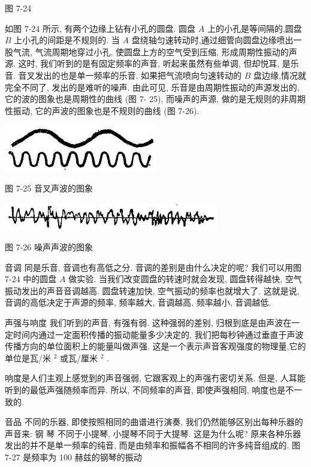 \documentclass[10pt]{article}
\begin{document}
图 7-24

如图 7-24 所示, 有两个边缘上钻有小孔的圆盘. 圆盘 \(A\) 上的小孔是等间隔的,圆盘 \(B\) 上小孔的间距是不规则的. 当 \(A\) 盘绕轴匀速转动时,通过细管向圆盘边缘喷出一股气流, 气流周期地穿过小孔, 使圆盘上方的空气受到压缩, 形成周期性振动的声源. 这时, 我们听到的是有固定频率的声音, 听起来虽然有些单调, 但却悦耳, 是乐音. 音叉发出的也是单一频率的乐音. 如果把气流喷向匀速转动的 \(B\) 盘边缘,情况就完全不同了, 发出的是难听的噪声. 由此可见, 乐音是由周期性振动的声源发出的, 它的波的图象也是周期性的曲线 (图 7- 25), 而噪声的声源, 做的是无规则的非周期性振动, 它的声波的图象也是不规则的曲线 (图 7-26).

\begin{center}
\includegraphics[max width=0.5\textwidth]{images/01912d55-147c-70aa-b0e0-1782a122f948_221_648542.jpg}
\end{center}

图 7-25 音叉声波的图象

\begin{center}
\includegraphics[max width=0.7\textwidth]{images/01912d55-147c-70aa-b0e0-1782a122f948_221_114021.jpg}
\end{center}

图 7-26 噪声声波的图象

音调 同是乐音, 音调也有高低之分. 音调的差别是由什么决定的呢? 我们可以用图 7-24 中的圆盘 \(A\) 做实验. 当我们改变圆盘的转速时就会发现, 圆盘转得越快, 空气振动发出的声音音调越高. 圆盘转速加快, 空气振动的频率也就增大了. 这就是说, 音调的高低决定于声源的频率, 频率越大, 音调越高, 频率越小, 音调越低.

声强与响度 我们听到的声音, 有强有弱. 这种强弱的差别, 归根到底是由声波在一定时间内通过一定面积传播的振动能量多少决定的, 我们把每秒钟通过垂直于声波传播方向的单位面积上的能量叫做声强. 这是一个表示声音客观强度的物理量,它的单位是瓦/米 \({}^{2}\) 或瓦/厘米 \({}^{2}\) .

响度是人们主观上感觉到的声音强弱, 它跟客观上的声强冇密切关系. 但是, 人耳能听到的最低声强随频率而异. 所以, 不同频率的声音, 即使声强相同, 响度也是不一致的.

音品 不同的乐器, 即使按照相同的曲谱进行演奏, 我们仍然能够区别出每种乐器的声音来: 钢 琴 不同于小提琴, 小提琴不同于大提琴. 这是为什么呢? 原来各种乐器发出的并不是单一频率的纯音, 而是由频率和振幅各不相同的许多纯音组成的. 图 7-27 是频率为 100 赫兹的钢琴的振动
\end{document}

